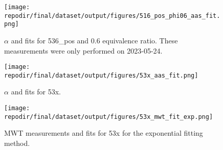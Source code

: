 \begin{figure}[]
\centering
\texttt{[image: \\repodir/final/dataset/output/figures/516\_pos\_phi06\_aas\_fit.png]}
\caption{$\alpha$ and fits for 536\_pos and 0.6 equivalence ratio. These measurements were only performed on 2023-05-24.}
\label{fig:SI_536_pos_phi06_aas_fit}
\end{figure}

\begin{figure}[]
\centering
\texttt{[image: \\repodir/final/dataset/output/figures/53x\_aas\_fit.png]}
\caption{$\alpha$ and fits for 53x.}
\label{fig:SI_53x_aas_fit}
\end{figure}


\begin{figure}[]
\centering
\texttt{[image: \\repodir/final/dataset/output/figures/53x\_mwt\_fit\_exp.png]}
\caption{MWT measurements and fits for 53x for the exponential fitting method. }
\label{fig:SI_53x_mwt_fit_exp}
\end{figure}
